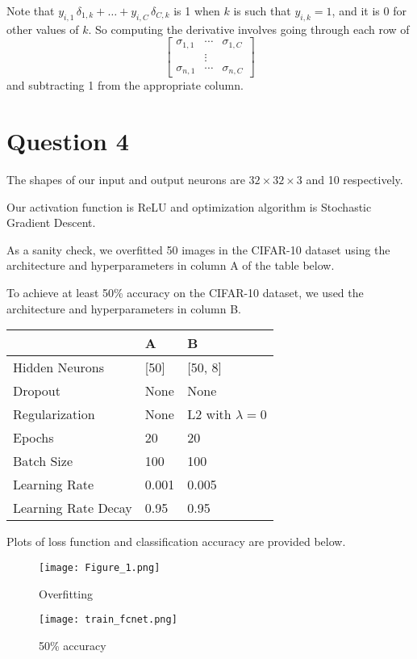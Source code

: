 \documentclass[12pt, a4paper]{article}
\begin{document}
Note that $y_{i,1} \, \delta_{1,k} + \dots + y_{i,C} \, \delta_{C,k}$ is 1 when $k$ is such that $y_{i,k} = 1$, and it is 0 for other values of $k$. So computing the derivative involves going through each row of
\[ \begin{bmatrix}
   \sigma_{1,1} & \dotsm & \sigma_{1,C} \\
   & \vdots & \\
   \sigma_{n,1} & \dotsm & \sigma_{n,C}
   \end{bmatrix} \]
and subtracting 1 from the appropriate column.

\section*{Question 4}

The shapes of our input and output neurons are $32 \times 32 \times 3$ and 10 respectively.\par
\bigskip
Our activation function is ReLU and optimization algorithm is Stochastic Gradient Descent.\par
\bigskip
As a sanity check, we overfitted 50 images in the CIFAR-10 dataset using the architecture and hyperparameters in column A of the table below.\par
\bigskip
To achieve at least 50\% accuracy on the CIFAR-10 dataset, we used the architecture and hyperparameters in column B.
\begin{center}
\begin{tabular} { C{4cm} | C{2.5cm} C{3cm} }
    & A & B \\ \hline
    Hidden Neurons      & [50]  & [50, 8] \\
    Dropout				& None	& None  \\
    Regularization      & None  & L2 with $\lambda = 0$ \\
    Epochs              &   20  &   20  \\
    Batch Size          &  100  &  100  \\
    Learning Rate       & 0.001 & 0.005 \\
    Learning Rate Decay & 0.95  & 0.95
\end{tabular}
\end{center}
\bigskip

Plots of loss function and classification accuracy are provided below.

\begin{figure} [h!]
    \begin{minipage}{0.5\textwidth}
    \centering
    \texttt{[image: Figure\_1.png]}
    \caption{Overfitting} \label{Fig:Data1}
    \end{minipage}
    \begin {minipage}{0.5\textwidth}
    \centering
    \texttt{[image: train\_fcnet.png]}
    \caption{50\% accuracy} \label{Fig:Data2}
    \end{minipage}
\end{figure}
\end{document}
